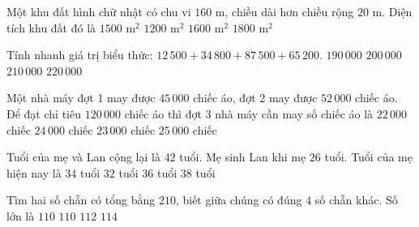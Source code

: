 \begin{ex} %
Một khu đất hình chữ nhật có chu vi $160\text{ m}$, chiều dài hơn chiều rộng $20\text{ m}$. Diện tích khu đất đó là
\choice
{\True $1500\text{ m}^2$}
{$1200\text{ m}^2$}
{$1600\text{ m}^2$}
{$1800\text{ m}^2$}
\end{ex}

\begin{ex} %
Tính nhanh giá trị biểu thức: $12\,500 + 34\,800 + 87\,500 + 65\,200$.
\choice
{$190\,000$}
{\True $200\,000$}
{$210\,000$}
{$220\,000$}
\end{ex}

\begin{ex} %
Một nhà máy đợt 1 may được $45\,000$ chiếc áo, đợt 2 may được $52\,000$ chiếc áo. Để đạt chỉ tiêu $120\,000$ chiếc áo thì đợt 3 nhà máy cần may số chiếc áo là
\choice
{$22\,000$ chiếc}
{$24\,000$ chiếc}
{\True $23\,000$ chiếc}
{$25\,000$ chiếc}
\end{ex}

\begin{ex} %
Tuổi của mẹ và Lan cộng lại là $42$ tuổi. Mẹ sinh Lan khi mẹ $26$ tuổi. Tuổi của mẹ hiện nay là
\choice
{\True $34$ tuổi}
{$32$ tuổi}
{$36$ tuổi}
{$38$ tuổi}
\end{ex}

\begin{ex} %
Tìm hai số chẵn có tổng bằng $210$, biết giữa chúng có đúng $4$ số chẵn khác. Số lớn là
\choice
{$110$}
{\True $110$}
{$112$}
{$114$}
\end{ex}

